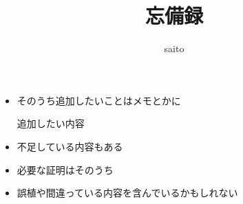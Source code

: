\documentclass[dvipdfmx,a4paper,16pt]{jreport}
\title{忘備録}
\author{saito}
\begin{document}
\maketitle

\begin{itemize}
  \item そのうち追加したいことはメモとかに
  \begin{Memo}
    追加したい内容
  \end{Memo}

  \item 不足している内容もある

  \item 必要な証明はそのうち

  \item 誤植や間違っている内容を含んでいるかもしれない
\end{itemize}

\setcounter{tocdepth}{3}
\tableofcontents


\newpage


\nocite{*}










\end{document}
